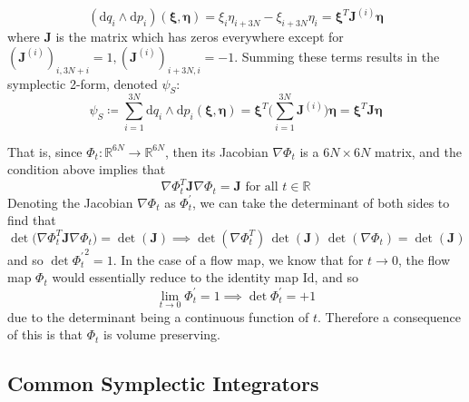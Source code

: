       \begin{equation}
        (\mathrm{d}q_i \wedge \mathrm{d} p_i)(\boldsymbol{\xi}, \boldsymbol{\eta}) = \xi_i\eta_{i + 3N} - \xi_{i + 3N} \eta_i = \boldsymbol{\xi}^T \mathbf{J}^{(i)} \boldsymbol{\eta}
      \end{equation}
      where $\mathbf{J}$ is the matrix which has zeros everywhere except for $(\mathbf{J}^{(i)})_{i, 3N + i} = 1, (\mathbf{J}^{(i)})_{i + 3N, i} = -1$. Summing these terms results in the symplectic 2-form, denoted $\psi_S$: 
      \begin{equation}
        \psi_S \coloneqq \sum_{i=1}^{3N} \mathrm{d}q_i \wedge \mathrm{d} p_i (\boldsymbol{\xi}, \boldsymbol{\eta}) = \boldsymbol{\xi}^T \bigg( \sum_{i=1}^{3N} \mathbf{J}^{(i)} \bigg) \boldsymbol{\eta} = \boldsymbol{\xi}^T \mathbf{J} \boldsymbol{\eta}
      \end{equation}

      That is, since $\Phi_t: \mathbb{R}^{6N} \longrightarrow \mathbb{R}^{6N}$, then its Jacobian $\nabla \Phi_t$ is a $6N \times 6N$ matrix, and the condition above implies that 
      \begin{equation}
        \nabla \Phi_t^T \mathbf{J} \nabla \Phi_t = \mathbf{J} \text{ for all } t \in \mathbb{R}
      \end{equation}
      Denoting the Jacobian $\nabla \Phi_t$ as $\Phi_t^\prime$, we can take the determinant of both sides to find that 
      \begin{equation}
        \det\big(\nabla \Phi_t^T \mathbf{J} \nabla \Phi_t\big) = \det(\mathbf{J}) \implies \det(\nabla \Phi_t^T) \, \det(\mathbf{J})\, \det(\nabla \Phi_t) = \det(\mathbf{J})
      \end{equation}
      and so $\det{\Phi_t^\prime}^2 = 1$. In the case of a flow map, we know that for $t \rightarrow 0$, the flow map $\Phi_{t}$ would essentially reduce to the identity map $\mathrm{Id}$, and so
      \begin{equation}
        \lim_{t \rightarrow 0} \Phi_t^\prime = 1 \implies \det{\Phi_t^\prime} = + 1
      \end{equation}
      due to the determinant being a continuous function of $t$. Therefore a consequence of this is that $\Phi_t$ is volume preserving. 

  \subsection{Common Symplectic Integrators}

